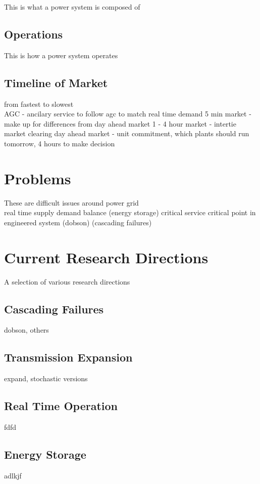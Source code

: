 This is what a power system is composed of

\subsection{Operations}

This is how a power system operates

\subsection{Timeline of Market}
from fastest to slowest \\
AGC - ancilary service to follow agc to match real time demand
5 min market - make up for differences from day ahead market
1 - 4 hour market - intertie market clearing
day ahead market - unit commitment, which plants should run tomorrow, 4 hours to make decision

\section{Problems}

These are difficult issues around power grid \\

real time supply demand balance (energy storage)
critical service
critical point in engineered system (dobson) (cascading failures)

\section{Current Research Directions}
A selection of various research directions

\subsection{Cascading Failures}
dobson, others

\subsection{Transmission Expansion}
expand, stochastic versions

\subsection{Real Time Operation}
fdfd

\subsection{Energy Storage}
adlkjf
